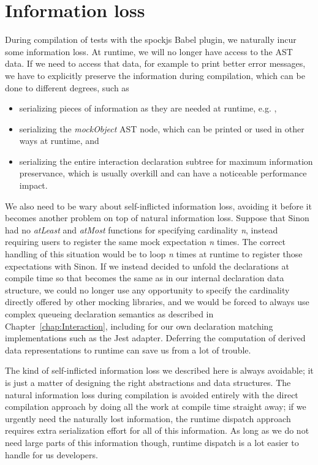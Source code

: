 \section{Information loss}
During compilation of tests with the spockjs Babel plugin,
we naturally incur some information loss.
At runtime, we will no longer have access to the AST data.
If we need to access that data,
for example to print better error messages,
we have to explicitly preserve the information during compilation,
which can be done to different degrees, such as
\begin{itemize}
  \item serializing pieces of information
    as they are needed at runtime, e.g.
    ,
  \item serializing the \textit{mockObject} AST node,
    which can be printed or used in other ways at runtime, and
  \item serializing the entire interaction declaration subtree
    for maximum information preservance,
    which is usually overkill and can have
    a noticeable performance impact.
\end{itemize}

We also need to be wary about self-inflicted information loss,
avoiding it before it becomes another problem
on top of natural information loss.
Suppose that Sinon had no
\textit{atLeast} and \textit{atMost} functions
for specifying cardinality \textit{n},
instead requiring users to
register the same mock expectation \textit{n} times.
The correct handling of this situation would be
to loop \textit{n} times at runtime
to register those expectations with Sinon.
If we instead decided to unfold the declarations at compile time so that
 becomes the same as 
in our internal declaration data structure,
we could no longer use any opportunity
to specify the cardinality directly
offered by other mocking libraries,
and we would be forced to always use complex queueing declaration semantics
as described in Chapter~\ref{chap:Interaction},
including for our own declaration matching implementations
such as the Jest adapter.
Deferring the computation of derived data representations to runtime
can save us from a lot of trouble.

The kind of self-inflicted information loss we described here is always avoidable;
it is just a matter of designing the right abstractions and data structures.
The natural information loss during compilation
is avoided entirely with the direct compilation approach
by doing all the work at compile time straight away;
if we urgently need the naturally lost information,
the runtime dispatch approach requires
extra serialization effort for all of this information.
As long as we do not need large parts of this information though,
runtime dispatch is a lot easier to handle for us developers.

